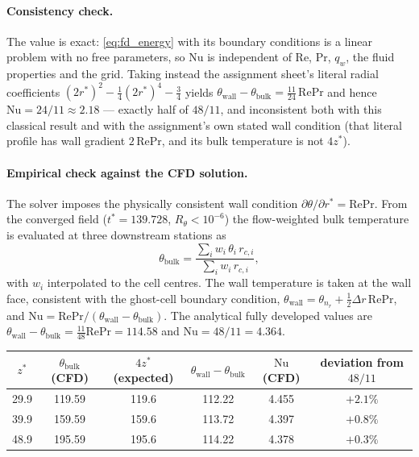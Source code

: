 \documentclass[12pt,a4paper]{article}
\newcommand{\Rey}{\text{Re}}
\newcommand{\Pran}{\text{Pr}}
\begin{document}
\paragraph{Consistency check.} The value is exact: \eqref{eq:fd_energy} with its boundary
conditions is a linear problem with no free parameters, so $\text{Nu}$ is independent of $\Rey$,
$\Pran$, $q_w$, the fluid properties and the grid. Taking instead the assignment sheet's literal
radial coefficients $(2r^*)^2-\tfrac14(2r^*)^4-\tfrac34$ yields
$\theta_{\text{wall}}-\theta_{\text{bulk}} = \tfrac{11}{24}\,\Rey\Pran$ and hence
$\text{Nu}=24/11\approx2.18$ --- exactly half of $48/11$, and inconsistent both with this
classical result and with the assignment's own stated wall condition (that literal profile has
wall gradient $2\,\Rey\Pran$, and its bulk temperature is not $4z^*$).

\paragraph{Empirical check against the CFD solution.} The solver imposes the physically
consistent wall condition $\partial\theta/\partial r^*=\Rey\Pran$. From the converged field
($t^*=139.728$, $R_\theta<10^{-6}$) the flow-weighted bulk temperature is evaluated at three
downstream stations as
\begin{equation}
    \theta_{\text{bulk}} = \frac{\sum_i w_{i}\,\theta_{i}\,r_{c,i}}{\sum_i w_{i}\,r_{c,i}},
\end{equation}
with $w_i$ interpolated to the cell centres. The wall temperature is taken at the wall face,
consistent with the ghost-cell boundary condition,
$\theta_{\text{wall}} = \theta_{n_r} + \tfrac12\Delta r\,\Rey\Pran$, and
$\text{Nu}=\Rey\Pran/(\theta_{\text{wall}}-\theta_{\text{bulk}})$. The analytical fully developed
values are $\theta_{\text{wall}}-\theta_{\text{bulk}}=\tfrac{11}{48}\Rey\Pran=114.58$ and
$\text{Nu}=48/11=4.364$.

\begin{center}
\begin{tabular}{cccccc}
\toprule
$z^*$ & $\theta_{\text{bulk}}$ (CFD) & $4z^*$ (expected) & $\theta_{\text{wall}}-\theta_{\text{bulk}}$ & $\text{Nu}$ (CFD) & deviation from $48/11$ \\
\midrule
29.9 & 119.59 & 119.6 & 112.22 & 4.455 & $+2.1\%$ \\
39.9 & 159.59 & 159.6 & 113.72 & 4.397 & $+0.8\%$ \\
48.9 & 195.59 & 195.6 & 114.22 & 4.378 & $+0.3\%$ \\
\bottomrule
\end{tabular}
\end{center}
\end{document}
